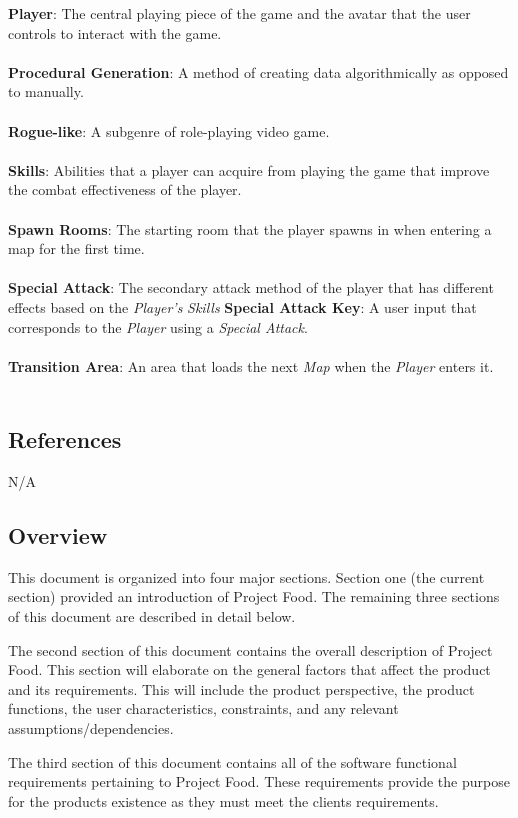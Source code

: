 \documentclass[12pt, titlepage]{article}
\begin{document}
    \textbf{Player}: The central playing piece of the game and the avatar that the user controls to interact with the game.\\\\
    \textbf{Procedural Generation}: A method of creating data algorithmically as opposed to manually.\\\\
    \textbf{Rogue-like}: A subgenre of role-playing video game. \\\\
    \textbf{Skills}: Abilities that a player can acquire from playing the game that improve the combat effectiveness of the player.\\\\
    \textbf{Spawn Rooms}: The starting room that the player spawns in when entering a map for the first time.\\\\
    \textbf{Special Attack}: The secondary attack method of the player that has different effects based on the \textit{Player's} \textit{Skills}
    \textbf{Special Attack Key}: A user input that corresponds to the \textit{Player} using a \textit{Special Attack}. \\\\
    \textbf{Transition Area}: An area that loads the next \textit{Map} when the \textit{Player} enters it. \\\\
  
  \subsection{References}
  N/A
  \subsection{Overview}

  This document is organized into four major sections. Section one (the current section) provided an introduction of Project Food. The remaining three sections of this document are described in detail below. 

  The second section of this document contains the overall description of Project Food. This section will elaborate on the general factors that affect the product and its requirements. This will include the product perspective, the product functions, the user characteristics, constraints, and any relevant assumptions/dependencies.

  The third section of this document contains all of the software functional requirements pertaining to Project Food. These requirements provide the purpose for the products existence as they must meet the clients requirements.
\end{document}
